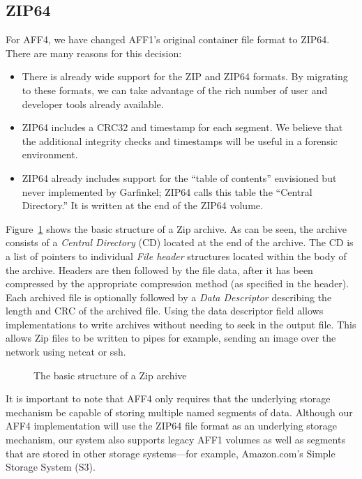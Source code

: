 \documentclass[10pt, conference]{IEEEtran}
\begin{document}
\subsection{ZIP64}
For AFF4, we have changed AFF1's original container file format to
ZIP64\cite{zipspecs}. There are many reasons for this decision:

\begin{itemize}
\item There is already wide support for the ZIP and ZIP64 formats. By
  migrating to these formats, we can take advantage of the rich number
  of user and developer tools already available.
\item ZIP64 includes a CRC32 and timestamp for each segment. We
  believe that the additional integrity checks and timestamps will be
  useful in a forensic environment.
\item ZIP64 already includes support for the ``table of contents''
  envisioned but never implemented by Garfinkel; ZIP64 calls this
  table the ``Central Directory.'' It is written at the end of the
  ZIP64 volume.
\end{itemize}

Figure~\ref{zip_structure} shows the basic structure of a Zip
archive. As can be seen, the archive consists of a {\em Central Directory} (CD)
located at the end of the archive. The CD is a list of pointers to
individual {\em File header} structures located within the body of the
archive. Headers are then followed by the file data, after it has been
compressed by the appropriate compression method (as specified in the
header). Each archived file is optionally followed by a {\em Data
Descriptor} describing the length and CRC of the archived file. Using
the data descriptor field allows implementations to write archives
without needing to seek in the output file. This allows Zip files to
be written to pipes for example, sending an image over the network
using netcat or ssh.

\begin{figure}[tb]
  \begin{center}
  \mbox{\columnwidth {}}
  \caption{The basic structure of a Zip archive}
  \label{zip_structure}
  \end{center}
\end{figure}

It is important to note that AFF4 only requires that the underlying storage mechanism
be capable of storing multiple named segments of data. Although our
AFF4 implementation will use the ZIP64 file format as an underlying storage
mechanism, our system also supports legacy AFF1 volumes as well as
segments that are stored in other storage systems---for example,
Amazon.com's Simple Storage System (S3)\cite{s2-aws-home-page-money}.
\end{document}
